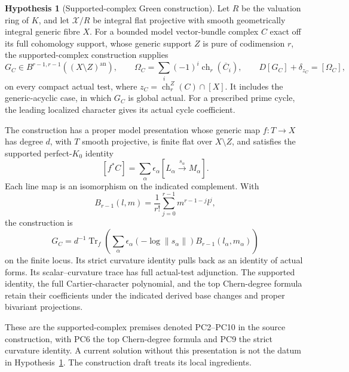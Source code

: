 \documentclass[11pt,a4paper]{article}
\theoremstyle{definition}
\newtheorem{hypothesis}[theorem]{Hypothesis}
\theoremstyle{remark}
\numberwithin{equation}{section}
\newcommand{\an}{\mathrm{an}}
\begin{document}
\begin{hypothesis}[Supported-complex Green construction]\label{hyp:height-supported}
Let $R$ be the valuation ring of $K$, and let $\mathcal X/R$ be integral flat projective with smooth geometrically integral generic fibre $X$. For a bounded model vector-bundle complex $C$ exact off its full cohomology support, whose generic support $Z$ is pure of codimension $r$, the supported-complex construction supplies
\[
 G_C\in B^{r-1,r-1}((X\setminus Z)^{\an}),\qquad
 \Omega_C=\sum_i(-1)^i\operatorname{ch}_r(\overline C_i),
 \qquad D[G_C]+\delta_{z_C}=[\Omega_C],
\]
on every compact actual test, where
$z_C=\operatorname{ch}_r^Z(C)\cap[X]$. It includes the generic-acyclic case, in which $G_C$ is global actual. For a prescribed prime cycle, the leading localized character gives its actual cycle coefficient.

The construction has a proper model presentation whose generic map $f:T\to X$ has degree $d$, with $T$ smooth projective, is finite flat over $X\setminus Z$, and satisfies the supported perfect-$K_0$ identity
\[
 [f^*C]=\sum_\alpha\epsilon_\alpha
 [L_\alpha\xrightarrow{s_\alpha}M_\alpha].
\]
Each line map is an isomorphism on the indicated complement. With
\[
 B_{r-1}(l,m)=\frac1{r!}\sum_{j=0}^{r-1}m^{r-1-j}l^j,
\]
the construction is
\[
 G_C=d^{-1}\operatorname{Tr}_{f}
 \left(\sum_\alpha\epsilon_\alpha
 (-\log\|s_\alpha\|)B_{r-1}(l_\alpha,m_\alpha)\right)
\]
on the finite locus. Its strict curvature identity pulls back as an identity of actual forms. Its scalar--curvature trace has full actual-test adjunction. The supported identity, the full Cartier-character polynomial, and the top Chern-degree formula retain their coefficients under the indicated derived base changes and proper bivariant projections.
\end{hypothesis}

These are the supported-complex premises denoted PC2--PC10 in the source construction, with PC6 the top Chern-degree formula and PC9 the strict curvature identity. A current solution without this presentation is not the datum in Hypothesis~\ref{hyp:height-supported}. The construction draft \cite{GC} treats its local ingredients.
\end{document}
